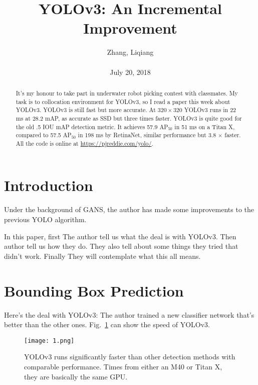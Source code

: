 \documentclass[10pt,twocolumn,letterpaper]{article}
\title{\textbf{YOLOv3: An Incremental Improvement}}
\author{Zhang, Liqiang\\\\July 20, 2018}
\begin{document}
\maketitle
\par
\begin{abstract}
It's my honour to take part in underwater robot picking contest with classmates. My task is to collocation environment for YOLOv3, so I read a paper this week about YOLOv3. YOLOv3 is still fast but more accurate. At $320\times 320$ YOLOv3 runs in 22 ms at 28.2 mAP, as accurate as SSD but three times faster. YOLOv3 is quite good for the old .5 IOU mAP detection metric. It achieves 57.9 AP$_{50}$ in 51 ms on a Titan X, compared to 57.5 AP$_{50}$ in 198 ms by RetinaNet, similar performance but 3.8 $\times$ faster. All the code is online at \url{https://pjreddie.com/yolo/}.
\end{abstract}
\section{Introduction}
Under the background of GANS, the author has made some improvements to the previous YOLO algorithm. 
\par
In this paper, first The author tell us what the deal is with YOLOv3. Then author tell us how they do. They also tell about some things they tried that didn’t work. Finally They will contemplate what this all means.
\section{Bounding Box Prediction}
Here’s the deal with YOLOv3: The author trained a new classifier network that’s better than the other ones. Fig.~\ref{1} can show the speed of YOLOv3. 
\begin{figure}
\begin{center}
  \texttt{[image: 1.png]}\\
  \caption{YOLOv3 runs significantly faster than other detection methods
with comparable performance. Times from either an M40 or Titan
X, they are basically the same GPU.}\label{1}
\end{center}
\end{figure}
\end{document}
